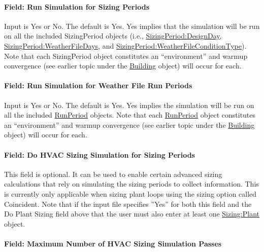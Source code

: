 \paragraph{Field: Run Simulation for Sizing Periods}\label{field-run-simulation-for-sizing-periods}

Input is Yes or No. The default is Yes. Yes implies that the simulation will be run on all the included SizingPeriod objects (i.e., \hyperref[sizingperioddesignday]{Sizing\-Period:\-Design\-Day}, \hyperref[sizingperiodweatherfiledays]{Sizing\-Period:\-Weather\-File\-Days}, and \hyperref[sizingperiodweatherfileconditiontype]{Sizing\-Period:\-Weather\-File\-Condition\-Type}). Note that each Sizing\-Period object constitutes an ``environment'' and warmup convergence (see earlier topic under the \hyperref[building]{Building} object) will occur for each.

\paragraph{Field: Run Simulation for Weather File Run Periods}\label{field-run-simulation-for-weather-file-run-periods}

Input is Yes or No. The default is Yes. Yes implies the simulation will be run on all the included \hyperref[runperiod]{RunPeriod} objects. Note that each \hyperref[runperiod]{RunPeriod} object constitutes an ``environment'' and warmup convergence (see earlier topic under the \hyperref[building]{Building} object) will occur for each.

\paragraph{Field: Do HVAC Sizing Simulation for Sizing Periods}\label{field-do-hvac-sizing-simulation-for-sizing-periods}

This field is optional. It can be used to enable certain advanced sizing calculations that rely on simulating the sizing periods to collect information. This is currently only applicable when sizing plant loops using the sizing option called Coincident. Note that if the input file specifies ''Yes'' for both this field and the Do Plant Sizing field above that the user must also enter at least one \hyperref[sizingplant]{Sizing:Plant} object.

\paragraph{Field: Maximum Number of HVAC Sizing Simulation Passes}\label{field-maximum-number-of-hvac-sizing-simulation-passes}

